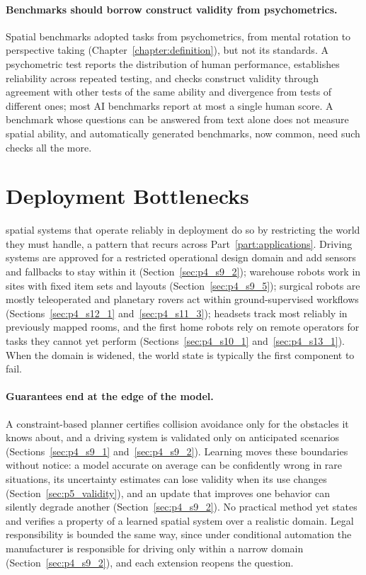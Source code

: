 \paragraph{Benchmarks should borrow construct validity from psychometrics.}
Spatial benchmarks adopted tasks from psychometrics, from mental rotation to perspective taking (Chapter~\ref{chapter:definition}), but not its standards.
A psychometric test reports the distribution of human performance, establishes reliability across repeated testing, and checks construct validity through agreement with other tests of the same ability and divergence from tests of different ones; most AI benchmarks report at most a single human score.
A benchmark whose questions can be answered from text alone does not measure spatial ability, and automatically generated benchmarks, now common, need such checks all the more.




\section{Deployment Bottlenecks}
\label{sec:p5_deployment}

 spatial systems that operate reliably in deployment do so by restricting the world they must handle, a pattern that recurs across Part~\ref{part:applications}.
Driving systems are approved for a restricted operational design domain and add sensors and fallbacks to stay within it (Section~\ref{sec:p4_s9_2}); warehouse robots work in sites with fixed item sets and layouts (Section~\ref{sec:p4_s9_5}); surgical robots are mostly teleoperated and planetary rovers act within ground-supervised workflows (Sections~\ref{sec:p4_s12_1} and~\ref{sec:p4_s11_3}); headsets track most reliably in previously mapped rooms, and the first home robots rely on remote operators for tasks they cannot yet perform (Sections~\ref{sec:p4_s10_1} and~\ref{sec:p4_s13_1}).
When the domain is widened, the world state is typically the first component to fail.

\paragraph{Guarantees end at the edge of the model.}
A constraint-based planner certifies collision avoidance only for the obstacles it knows about, and a driving system is validated only on anticipated scenarios (Sections~\ref{sec:p4_s9_1} and~\ref{sec:p4_s9_2}).
Learning moves these boundaries without notice: a model accurate on average can be confidently wrong in rare situations, its uncertainty estimates can lose validity when its use changes (Section~\ref{sec:p5_validity}), and an update that improves one behavior can silently degrade another (Section~\ref{sec:p4_s9_2}).
No practical method yet states and verifies a property of a learned spatial system over a realistic domain.
Legal responsibility is bounded the same way, since under conditional automation the manufacturer is responsible for driving only within a narrow domain (Section~\ref{sec:p4_s9_2}), and each extension reopens the question.

